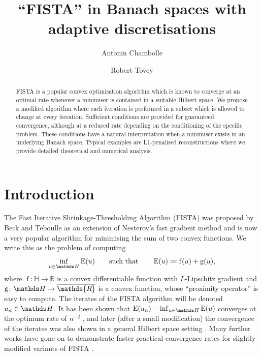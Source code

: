 \documentclass[smallextended]{svjour3}
\author{Antonin Chambolle \and Robert Tovey }
\institute{A. Chambolle \at
	CEREMADE, CNRS \& Université Paris Dauphine, PSL Research University, Paris \\
	\email{chambolle@ceremade.dauphine.fr}, ORCID: 0000-0002-9465-4659          %
	\and
	R. Tovey \at
	MOKAPLAN, INRIA Paris, Paris \\
	\email{robert.tovey@inria.fr}, ORCID: 0000-0001-5411-2268
}
\title{``FISTA'' in Banach spaces with adaptive discretisations}
\let\F\mathds\let\C\mathcal\newcommand{\R}{\F{R}}\newcommand{\A}{\tens{A}}
\newcommand{\op}[1]{\operatorname{#1}}
\newcommand{\1}{\F{1}}
\newcommand{\Emin}[1][\var0]{\inf_{#1\in\F H}\op{E}(#1)}
\newcommand*{\var}[1]{%
	\IfEqCase{#1}{%
		{0}{u}%
		{1}{v}%
		{2}{w}%
	}[u#1]%
}
\begin{document}
	\maketitle
	
	\begin{abstract}
		FISTA is a popular convex optimisation algorithm which is known to converge at an optimal rate whenever a minimiser is contained in a suitable Hilbert space. We propose a modified algorithm where each iteration is performed in a subset which is allowed to change at every iteration. Sufficient conditions are provided for guaranteed convergence, although at a reduced rate depending on the conditioning of the specific problem. These conditions have a natural interpretation when a minimiser exists in an underlying Banach space. Typical examples are L1-penalised reconstructions where we provide detailed theoretical and numerical analysis.
	\end{abstract}
	
	\section{Introduction}
	The Fast Iterative Shrinkage-Thresholding Algorithm (FISTA) was proposed by Beck and Teboulle \cite{Beck2009} as an extension of Nesterov's fast gradient method \cite{Nesterov2004} and is now a very popular algorithm for minimising the sum of two convex functions.
	We write this as the problem of computing
	\begin{equation}\label{eq: min F = fD+fC}
		\Emin \qquad\text{such that}\qquad \op{E}(\var0)\coloneqq \op{f}(\var0) + \op{g}(\var0),
	\end{equation}
	where $\op{f}\colon\F H\to\R$ is a convex differentiable function with $L$-Lipschitz gradient and $\op{g}\colon\F H\to\bar\R$ is a convex function, whose ``proximity operator'' is easy to compute. The iterates of the FISTA algorithm will be denoted $\var0_n\in\F H$. It has been shown that $\op{E}(\var0_n) - \Emin$ converges at the optimum rate of $n^{-2}$ \cite{Beck2009}, and later (after a small modification) the convergence of the iterates was also shown in a general Hilbert space setting \cite{Chambolle2015}. Many further works have gone on to demonstrate faster practical convergence rates for slightly modified variants of FISTA \cite{Tao2016,Liang2017,Alamo2019}.
	
\end{document}

